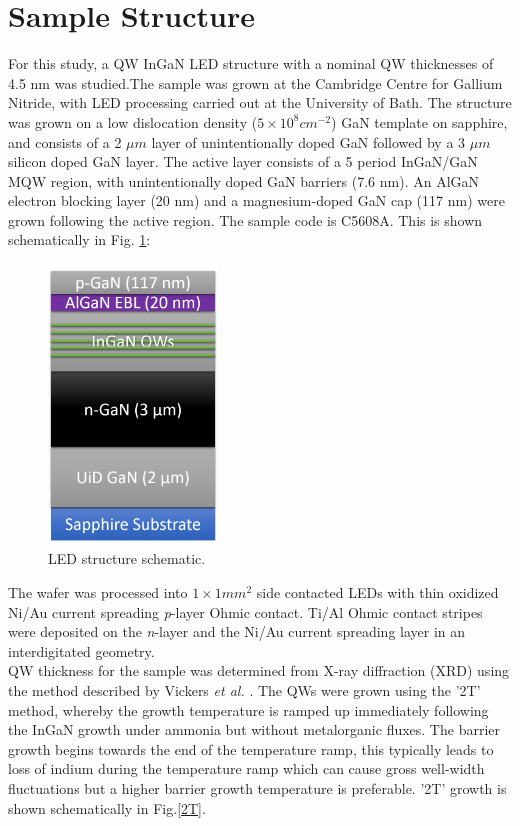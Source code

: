 \section{Sample Structure}
For this study, a QW InGaN LED structure with a nominal QW thicknesses of 4.5 nm was studied.The sample was grown at the Cambridge Centre for Gallium Nitride, with LED processing carried out at the University of Bath. The structure was grown on a low dislocation density  ($5 \times 10^{8}cm^{-2}$) GaN template on sapphire, and consists of a 2 $\mu m$ layer of unintentionally doped GaN followed by a 3 $\mu m$ silicon doped GaN layer. The active layer consists of a 5 period InGaN/GaN MQW region, with unintentionally doped GaN barriers (7.6 nm). An AlGaN electron blocking layer  (20 nm) and a magnesium-doped GaN cap (117 nm) were grown following the active region. The sample code is C5608A. This is shown schematically in Fig. \ref{LEDstruct}:

\begin{figure}[!ht]
	\centering
	\includegraphics[width=0.4\textwidth]{Figs/Ch3/LEDstruct}
	\caption[h] {LED structure schematic.}
	\label{LEDstruct}
\end{figure}

\FloatBarrier 
The wafer was processed into $1 \times 1 mm^{2}$ side contacted LEDs with thin oxidized Ni/Au current spreading {\it p}-layer Ohmic contact. Ti/Al Ohmic contact stripes were deposited on the {\it n}-layer and the Ni/Au current spreading layer in an interdigitated geometry.\\
QW thickness for the sample was determined from X-ray diffraction  (XRD) using the method described by Vickers {\it et al.} \cite{Vickers2003}. The QWs were grown using the '2T' method, whereby the growth temperature is ramped up immediately following the InGaN growth under ammonia but without metalorganic fluxes. The barrier growth begins towards the end of the temperature ramp, this typically leads to loss of indium during the temperature ramp which can cause gross well-width fluctuations \cite{Laak2013} but a higher barrier growth temperature is preferable\cite{Oliver2013}. '2T' growth is shown schematically in Fig.\ref{2T}.

